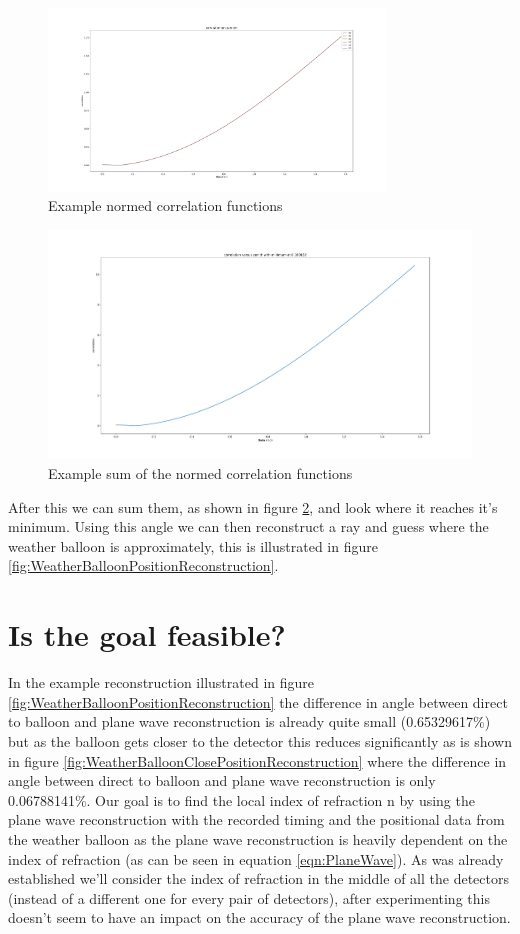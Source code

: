 \documentclass[11pt,a4paper,faculty=we,language=en,doctype=report]{cls/ugent-doc}
\begin{document}
\begin{figure}
	\centering
	\includegraphics[width=0.8\textwidth]{NormedCorrelation.pdf}
	\caption{Example normed correlation functions}
	\label{fig:NormedCorrelation}
\end{figure}
\begin{figure}
	\centering
	\includegraphics[width=\textwidth]{SummedCorrelation.pdf}
	\caption{Example sum of the normed correlation functions}
	\label{fig:SummedCorrelation}
\end{figure}
After this we can sum them, as shown in figure \ref{fig:SummedCorrelation}, and look
where it reaches it's minimum. Using this angle we can then reconstruct a ray and guess 
where the weather balloon is approximately, this is illustrated in figure 
\ref{fig:WeatherBalloonPositionReconstruction}. 
\section{Is the goal feasible?}
In the example reconstruction illustrated in figure
\ref{fig:WeatherBalloonPositionReconstruction} the difference in angle between
direct to balloon and plane wave reconstruction is already quite small
(0.65329617\%) but as the balloon gets closer to the detector this reduces
significantly as is shown in figure
\ref{fig:WeatherBalloonClosePositionReconstruction} where the difference in
angle between direct to balloon and plane wave reconstruction is only
0.06788141\%. Our goal is to find the local index of refraction n by using the
plane wave reconstruction with the recorded timing and the positional data from
the weather balloon as the plane wave reconstruction is heavily dependent on
the index of refraction (as can be seen in equation \ref{eqn:PlaneWave}). As
was already established we'll consider the index of refraction in the middle of
all the detectors (instead of a different one for every pair of detectors),
after experimenting this doesn't seem to have an impact on the accuracy of the
plane wave reconstruction. 
\end{document}
